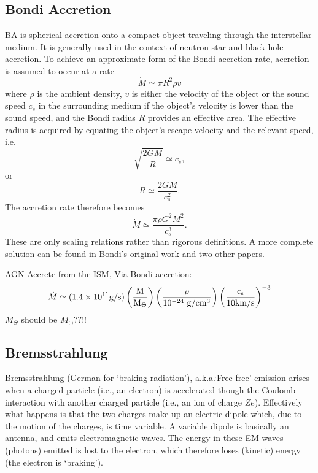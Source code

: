 \documentclass[11pt]{article}
\begin{document}
\subsection*{Bondi Accretion}
BA is spherical accretion onto a compact object traveling through
the interstellar medium. It is generally used in the context of
neutron star and black hole accretion. To achieve an approximate form
of the Bondi accretion rate, accretion is assumed to occur at a rate
\begin{equation}
  \dot {M}\simeq \pi R^{2}\rho v
\end{equation}
where $\rho$ is the ambient density, $v$ is either the velocity of the
object or the sound speed $ c_{s}$ in the surrounding medium if the
object's velocity is lower than the sound speed, and the Bondi radius
$R$ provides an effective area. The effective radius is acquired by
equating the object's escape velocity and the relevant speed, i.e.
\begin{equation}
  \sqrt{\frac{2 G M}{R}} \simeq c_s, 
\end{equation}
or
\begin{equation}
  R\simeq\frac{2 G M}{c_s^2}.
\end{equation}
The accretion rate therefore becomes
\begin{equation}
\dot {M} \simeq \frac{\pi \rho G^{2}M^{2}}{c_{s}^{3}} .
\end{equation}
These are only scaling relations rather than rigorous definitions. A
more complete solution can be found in Bondi's original work and two
other papers.

AGN Accrete from the ISM, Via Bondi accretion:
    \begin{equation}
      \dot{M} \simeq (1.4\times10^{11} \rm{g/s}) \left( \frac{M}{M_{\Theta}} \right) \left( \frac{\rho}{10^{-24}\ \rm{g / cm^{3}}} \right)  \left( \frac{c_s}{10 \rm{km/s}} \right)^{-3}
    \end{equation}
 $M_{\Theta}$ should be $M_{\odot}$??!!

\subsection{Bremsstrahlung}
Bremsstrahlung (German for ‘braking radiation’), a.k.a.`Free-free' emission arises when a charged particle (i.e., an electron) is accelerated though the Coulomb interaction with another charged particle (i.e., an ion of charge $Ze$). Effectively what happens is that the two charges make up an electric dipole which, due to the motion of the charges, is time variable. A variable dipole is basically an antenna, and emits electromagnetic waves. The energy in these EM waves (photons) emitted is lost to the electron, which therefore loses (kinetic) energy (the electron is ‘braking’).
\end{document}

